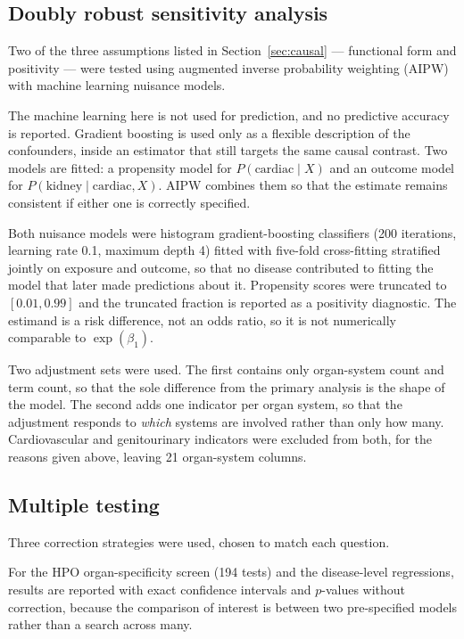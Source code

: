 \documentclass[11pt,a4paper]{article}
\begin{document}
\subsection{Doubly robust sensitivity analysis}
\label{sec:aipw}

Two of the three assumptions listed in Section~\ref{sec:causal} ---
functional form and positivity --- were tested using augmented inverse probability weighting
(AIPW) with machine learning nuisance models.

The machine learning here is not used for prediction, and no predictive accuracy is reported.
Gradient boosting is used only as a flexible description of the confounders, inside an
estimator that still targets the same causal contrast. Two models are fitted: a propensity
model for $P(\text{cardiac} \mid X)$ and an outcome model for
$P(\text{kidney} \mid \text{cardiac}, X)$. AIPW combines them so that the estimate remains
consistent if either one is correctly specified.

Both nuisance models were histogram gradient-boosting classifiers (200 iterations, learning
rate 0.1, maximum depth 4) fitted with five-fold cross-fitting stratified jointly on exposure
and outcome, so that no disease contributed to fitting the model that later made predictions
about it. Propensity scores were truncated to $[0.01, 0.99]$ and the truncated fraction is
reported as a positivity diagnostic. The estimand is a risk difference, not an odds ratio, so
it is not numerically comparable to $\exp(\beta_1)$.

Two adjustment sets were used. The first contains only organ-system count and term count, so
that the sole difference from the primary analysis is the shape of the model. The second adds
one indicator per organ system, so that the adjustment responds to \emph{which} systems are
involved rather than only how many. Cardiovascular and genitourinary indicators were excluded
from both, for the reasons given above, leaving 21 organ-system columns.

\subsection{Multiple testing}

Three correction strategies were used, chosen to match each question.

For the HPO organ-specificity screen (194 tests) and the disease-level regressions, results
are reported with exact confidence intervals and $p$-values without correction, because the
comparison of interest is between two pre-specified models rather than a search across many.
\end{document}
